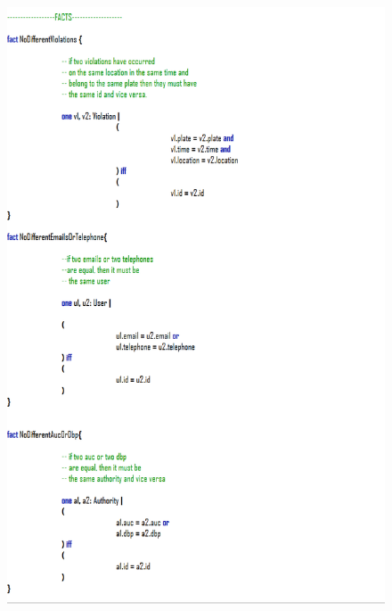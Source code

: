 \documentclass[12pt,a4paper]{article}
\begin{document}
			\begin{figure}[H]
				\centering
				\includegraphics[width=1\linewidth]{../assets/images/exports/user/Facts1.png}
				\label{fig:facts1}
			\end{figure}
\end{document}
